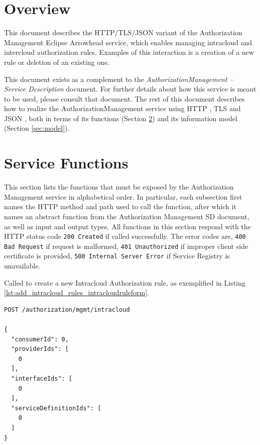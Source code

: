 \documentclass[a4paper]{arrowhead}
\newcommand{\fref}[1]{{\textcolor{ArrowheadBlue}{\hyperref[sec:functions:#1]{#1}}}}
\begin{document}
\section{Overview}
\label{sec:overview}

This document describes the HTTP/TLS/JSON variant of the Authorization Management Eclipse Arrowhead service, which enables managing intracloud and intercloud authorization rules.
Examples of this interaction is a creation of a new rule or deletion of an existing one.

This document exists as a complement to the \textit{AuthorizationManagement -- Service Description} document.
For further details about how this service is meant to be used, please consult that document.
The rest of this document describes how to realize the AuthorizationManagement service using HTTP \cite{fielding2014hypertext}, TLS \cite{rescorla2018transport} and JSON \cite{bray2014json}, both in terms of its functions (Section \ref{sec:functions}) and its information model (Section \ref{sec:model}).

\newpage

\section{Service Functions}
\label{sec:functions}

This section lists the functions that must be exposed by the Authorization Management service in alphabetical order.
In particular, each subsection first names the HTTP method and path used to call the function, after which it names an abstract function from the Authorization Management SD document, as well as input and output types.
All functions in this section respond with the HTTP status code \texttt{200 Created} if called successfully. The error codes are, \texttt{400 Bad Request} if request is malformed, \texttt{401 Unauthorized} if improper client side certificate is provided, \texttt{500 Internal Server Error} if Service Registry is unavailable.


Called to create a new Intracloud Authorization rule, as exemplified in Listing \ref{lst:add_intracloud_rules_intracloudruleform}.

\begin{lstlisting}[language=http,label={lst:add_intracloud_rules_intracloudruleform},caption={An \fref{Add Intracloud Rules} invocation.}]
POST /authorization/mgmt/intracloud

{
  "consumerId": 0,
  "providerIds": [
    0
  ],
  "interfaceIds": [
    0
  ],
  "serviceDefinitionIds": [
    0
  ]
}
\end{lstlisting}
\end{document}
